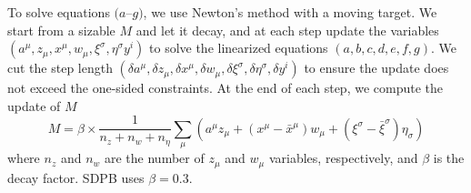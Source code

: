 \documentclass[11pt]{article}
\renewcommand{\(}{\left(}
\renewcommand{\)}{\right)}
\renewcommand{\[}{\left[}
\renewcommand{\]}{\right]}
\newcommand{\<}{\left\langle}
\renewcommand{\>}{\right\rangle}
\begin{document}
To solve equations $(a$--$g)$, we use Newton's method with a moving target. We start from a sizable $M$ and let it decay, and at each step update the variables $(a^\mu, z_\mu, x^\mu, w_\mu, \xi^\sigma, \eta^\sigma y^i)$ to solve the linearized equations $(a,b,c,d,e,f,g)$. We cut the step length $(\delta a^\mu, \delta z_\mu, \delta x^\mu, \delta w_\mu, \delta \xi^\sigma, \delta\eta^\sigma, \delta y^i)$ to ensure the update does not exceed the one-sided constraints. At the end of each step, we compute the update of $M$
\begin{equation}
M = \beta \times \frac{1}{n_z + n_w + n_\eta}\sum_\mu (a^\mu z_\mu + (x^\mu - \bar x^\mu)w_\mu  + (\xi^\sigma - \bar \xi^\sigma)\eta_\sigma )
\end{equation}
where $n_z$ and $n_w$ are the number of $z_\mu$ and $w_\mu$ variables, respectively, and $\beta$ is the decay factor. SDPB uses $\beta = 0.3$.


    
    
\end{document}
